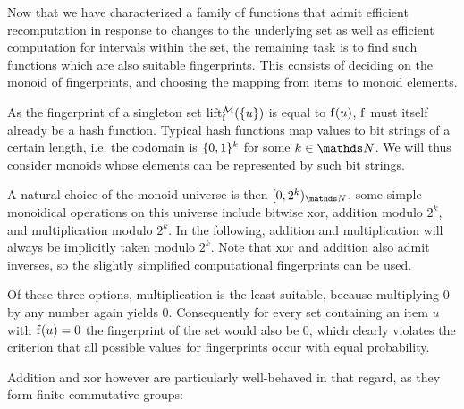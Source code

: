 Now that we have characterized a family of functions that admit efficient recomputation in response to changes to the underlying set as well as efficient computation for intervals within the set, the remaining task is to find such functions which are also suitable fingerprints. This consists of deciding on the monoid of fingerprints, and choosing the mapping from items to monoid elements.

As the fingerprint of a singleton set $\operatorname{lift_{\operatorname{f}}^{\mathcal{M}}}(\{u\})$ is equal to $\operatorname{f}(u)$, $\operatorname{f}$ must itself already be a hash function. Typical hash functions map values to bit strings of a certain length, i.e. the codomain is $\{0, 1\}^k$ for some $k \in \N$. We will thus consider monoids whose elements can be represented by such bit strings.

A natural choice of the monoid universe is then $\interval{0}{2^k}{\N}$, some simple monoidical operations on this universe include bitwise xor, addition modulo $2^k$, and multiplication modulo $2^k$. In the following, addition and multiplication will always be implicitly taken modulo $2^k$. Note that $\operatorname{xor}$ and addition also admit inverses, so the slightly simplified computational fingerprints can be used.

Of these three options, multiplication is the least suitable, because multiplying $0$ by any number again yields $0$. Consequently for every set containing an item $u$ with $\operatorname{f}(u) = 0$ the fingerprint of the set would also be $0$, which clearly violates the criterion that all possible values for fingerprints occur with equal probability.

Addition and xor however are particularly well-behaved in that regard, as they form finite commutative groups:

